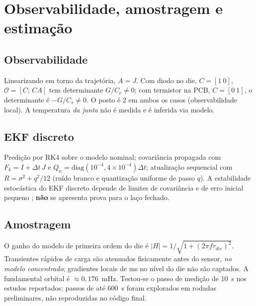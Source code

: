 \documentclass[12pt,a4paper]{article}
\begin{document}
\section{Observabilidade, amostragem e estimação}
\subsection{Observabilidade}\label{sec:obs}
Linearizando em torno da trajetória, $A=J$. Com diodo no die, $C=[1\ 0]$,
$\mathcal O=[C;\,CA]$ tem determinante $G/C_c\neq0$; com termistor na PCB,
$C=[0\ 1]$, o determinante é $-G/C_s\neq0$. O posto é 2 em ambos os casos
(observabilidade local). A temperatura \emph{da junta} não é medida e é inferida
via modelo.

\subsection{EKF discreto}
Predição por RK4 sobre o modelo nominal; covariância propagada com
$F_k=I+\Delta t\,J$ e $Q_n=\mathrm{diag}(10^{-4},4\times10^{-4})\Delta t$;
atualização sequencial com $R=\sigma^2+q^2/12$ (ruído branco e quantização
uniforme de passo $q$). A estabilidade estocástica do EKF discreto depende de
limites de covariância e de erro inicial pequeno \cite{reif1999}; \textbf{não}
se apresenta prova para o laço fechado.

\subsection{Amostragem}
O ganho do modelo de primeira ordem do die é
$|H|=1/\sqrt{1+(2\pi f\tau_{die})^2}$. Transientes rápidos de carga são
atenuados fisicamente antes do sensor, \emph{no modelo concentrado}; gradientes
locais de ms no nível do die não são captados. A fundamental orbital é
$\approx0{,}176$~mHz. Testou-se o passo de medição de 10~s nos estudos
reportados; passos de até 600~s foram explorados em rodadas preliminares, não
reproduzidas no código final.
\end{document}

